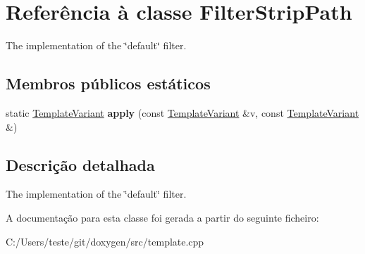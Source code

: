 \hypertarget{class_filter_strip_path}{\section{Referência à classe Filter\-Strip\-Path}
\label{class_filter_strip_path}
}


The implementation of the \char`\"{}default\char`\"{} filter.  


\subsection*{Membros públicos estáticos}
\begin{DoxyCompactItemize}
\item 
\hypertarget{class_filter_strip_path_ab7b829ea4352fa331a604fe7ea3e89c8}{static \hyperlink{class_template_variant}{Template\-Variant} {\bfseries apply} (const \hyperlink{class_template_variant}{Template\-Variant} \&v, const \hyperlink{class_template_variant}{Template\-Variant} \&)}\label{class_filter_strip_path_ab7b829ea4352fa331a604fe7ea3e89c8}

\end{DoxyCompactItemize}


\subsection{Descrição detalhada}
The implementation of the \char`\"{}default\char`\"{} filter. 

A documentação para esta classe foi gerada a partir do seguinte ficheiro\-:\begin{DoxyCompactItemize}
\item 
C\-:/\-Users/teste/git/doxygen/src/template.\-cpp\end{DoxyCompactItemize}
